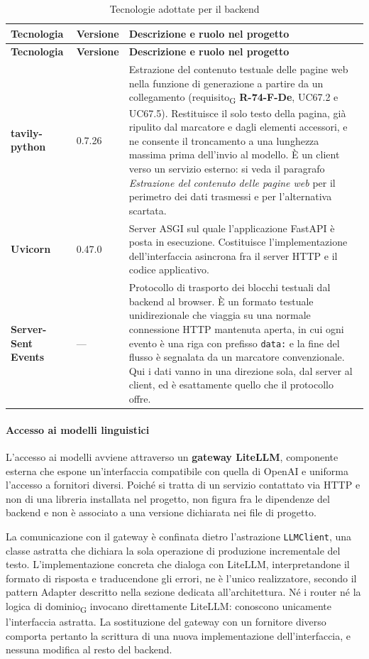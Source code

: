\documentclass[a4paper, 10pt]{article}
\newenvironment{tabellatec}[2]{%
  \begingroup
  \small
  \setlength{\tabcolsep}{4pt}
  \begin{longtable}{|p{2.8cm}|p{1.5cm}|p{9.2cm}|}
    \caption{#1}\label{#2}\\
    \hline
    \textbf{Tecnologia} & \textbf{Versione} & \textbf{Descrizione e ruolo nel progetto} \\
    \hline
    \endfirsthead
    \hline
    \textbf{Tecnologia} & \textbf{Versione} & \textbf{Descrizione e ruolo nel progetto} \\
    \hline
    \endhead
}{%
  \end{longtable}
  \endgroup
}
\begin{document}
\begin{tabellatec}{Tecnologie adottate per il backend}{tab:tec-backend}
    \textbf{tavily-python} & 0.7.26 & Estrazione del contenuto testuale delle pagine web nella funzione di generazione a partire da un collegamento (requisito\textsubscript{G} \textbf{R-74-F-De}, UC67.2 e UC67.5). Restituisce il solo testo della pagina, già ripulito dal marcatore e dagli elementi accessori, e ne consente il troncamento a una lunghezza massima prima dell'invio al modello. È un client verso un servizio esterno: si veda il paragrafo \textit{Estrazione del contenuto delle pagine web} per il perimetro dei dati trasmessi e per l'alternativa scartata. \\ \hline

    \textbf{Uvicorn} & 0.47.0 & Server ASGI sul quale l'applicazione FastAPI è posta in esecuzione. Costituisce l'implementazione dell'interfaccia asincrona fra il server HTTP e il codice applicativo. \\ \hline

    \textbf{Server-Sent Events} & --- & Protocollo di trasporto dei blocchi testuali dal backend al browser. È un formato testuale unidirezionale che viaggia su una normale connessione HTTP mantenuta aperta, in cui ogni evento è una riga con prefisso \texttt{data:} e la fine del flusso è segnalata da un marcatore convenzionale. Qui i dati vanno in una direzione sola, dal server al client, ed è esattamente quello che il protocollo offre. \\ \hline
\end{tabellatec}

\paragraph{Accesso ai modelli linguistici}
L'accesso ai modelli avviene attraverso un \textbf{gateway LiteLLM}, componente esterna che espone un'interfaccia compatibile con quella di OpenAI e uniforma l'accesso a fornitori diversi. Poiché si tratta di un servizio contattato via HTTP e non di una libreria installata nel progetto, non figura fra le dipendenze del backend e non è associato a una versione dichiarata nei file di progetto.

La comunicazione con il gateway è confinata dietro l'astrazione \texttt{LLMClient}, una classe astratta che dichiara la sola operazione di produzione incrementale del testo. L'implementazione concreta che dialoga con LiteLLM, interpretandone il formato di risposta e traducendone gli errori, ne è l'unico realizzatore, secondo il pattern Adapter descritto nella sezione dedicata all'architettura. Né i router né la logica di dominio\textsubscript{G} invocano direttamente LiteLLM: conoscono unicamente l'interfaccia astratta. La sostituzione del gateway con un fornitore diverso comporta pertanto la scrittura di una nuova implementazione dell'interfaccia, e nessuna modifica al resto del backend.
\end{document}

